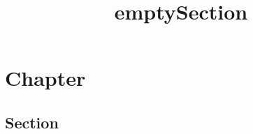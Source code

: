 \documentclass[a4paper,11pt,oneside,openany,report]{jsbook}
\title{emptySection}
\begin{document}
\maketitle
\chapter{Chapter}\label{ch:Chapter}
\section{Section}\label{sec:Chapter/Section}
\end{document}
